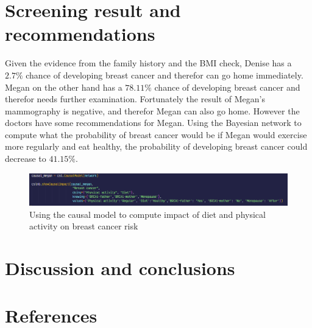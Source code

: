 \documentclass{article}
\begin{document}
\section{Screening result and recommendations}
Given the evidence from the family history and the BMI check, Denise has a $2.7\%$ chance of developing breast cancer and therefor can go home immediately.
Megan on the other hand has a $78.11\%$ chance of developing breast cancer and therefor needs further examination.
Fortunately the result of Megan's mammography is negative, and therefor Megan can also go home.
However the doctors have some recommendations for Megan. Using the Bayesian network to compute what the probability of breast cancer would be if Megan would exercise more regularly and eat healthy, the probability of developing breast cancer could decrease to $41.15\%$.

\begin{figure}[H]
    \centering
    \includegraphics[width=\textwidth]{../figures/causal_megan_code.png}
    \caption{Using the causal model to compute impact of diet and physical activity on breast cancer risk}
    \label{fig:causal:1}
\end{figure}



\section{Discussion and conclusions}

\section{References}


\end{document}
